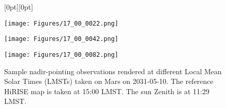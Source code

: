 \begin{figure}
\begin{minipage}[b]{0.0255\linewidth}
    \raisebox{2em}[0pt][0pt]{} %
\end{minipage}
\begin{minipage}[b]{0.25\linewidth}
    \centering
    \texttt{[image: Figures/17\_00\_0022.png]}
\end{minipage}
\begin{minipage}[b]{0.25\linewidth}
    \centering
    \texttt{[image: Figures/17\_00\_0042.png]}
\end{minipage}
\begin{minipage}[b]{0.25\linewidth}
    \centering
    \texttt{[image: Figures/17\_00\_0082.png]}
\end{minipage}
\caption{Sample nadir-pointing observations rendered at different Local Mean Solar Times (LMSTs) taken on Mars on 2031-05-10. The reference HiRISE map is taken at 15:00 LMST. The sun Zenith is at 11:29 LMST.}
\label{fig:obsv_lmst}
\end{figure}



